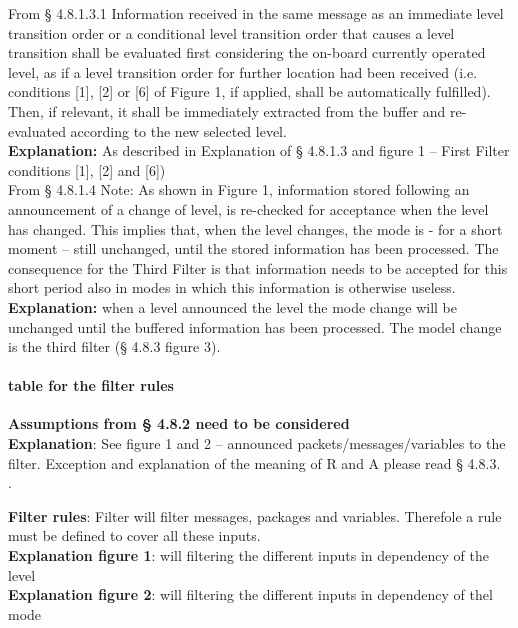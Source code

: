 \documentclass{template/openetcs_report}
\begin{document}
From § 4.8.1.3.1 Information received in the same message as an immediate level transition order or a conditional level transition order that causes a level transition shall be evaluated first considering the on-board currently operated level, as if a level transition order for further location had been received (i.e. conditions [1], [2] or [6] of Figure 1, if applied, shall be automatically fulfilled). Then, if relevant, it shall be immediately extracted from the buffer and re-evaluated according to the new selected level.\\
\textbf{Explanation:} As described in Explanation of § 4.8.1.3 and figure 1 – First Filter conditions [1], [2] and [6])\\

From § 4.8.1.4 Note: As shown in Figure 1, information stored following an announcement of a change of level, is re-checked for acceptance when the level has changed. This implies that, when the level changes, the mode is - for a short moment – still unchanged, until the stored information has been processed. The consequence for the Third Filter is that information needs to be accepted for this short period also in modes in which this information is otherwise useless.\\
\textbf{Explanation:} when a level announced the level the mode change will be unchanged until the buffered information has been processed. The model change is the third filter (§ 4.8.3 figure 3).\\

\paragraph{table for the filter rules}
\textbf{Assumptions from § 4.8.2 need to be considered}\\
\textbf{Explanation}: See figure 1 and 2 – announced packets/messages/variables to the filter. Exception and explanation of the meaning of R and A please read § 4.8.3.\\. 

\textbf {Filter rules}: Filter will filter messages, packages and variables. Therefole a rule must be defined to cover all these inputs.\\

\textbf {Explanation figure 1}: will filtering the different inputs in dependency of the level\\
\textbf {Explanation figure 2}: will filtering the different inputs in dependency of thel mode\\
\end{document}
